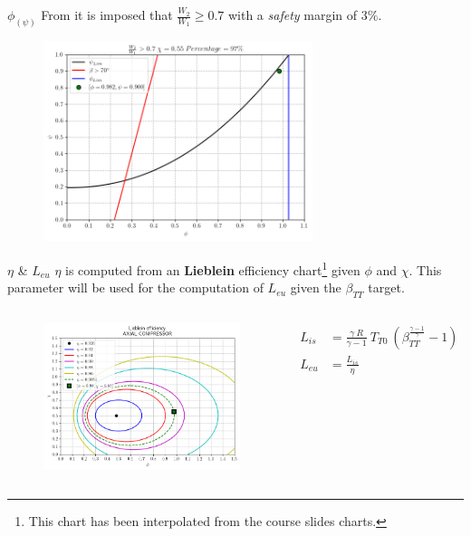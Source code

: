 	\begin{frame}{$\phi_{(\psi)}$}
		From \cite[Sec. 10.4]{axial2004} it is imposed that $\frac{W_2}{W_1} \geq 0.7$ with a \textit{safety} margin of $3 \%$.  
		\begin{figure}
			\centering
			\includegraphics[width=0.7\textwidth]{figures/stagePerf.png}
		\end{figure}
	\end{frame}
	\begin{frame}{$\eta$ \& $L_{eu}$}
		$\eta$ is computed from an \textbf{Lieblein} efficiency chart\footnote{This chart has been interpolated from the course slides charts.} given $\phi$ and $\chi$. This parameter will be used for the computation of $L_{eu}$ given the $\beta_{TT}$ target.
		\begin{columns}
				\begin{figure}
					\centering 
					\includegraphics[width=1\textwidth]{figures/efficiency.png}
				\end{figure}
			\begin{align}
				L_{is} & = \frac{\gamma \ R}{\gamma - 1} \ T_{T0} \ (\beta_{TT}^{{\frac{\gamma - 1}{\gamma}}} - 1) \nonumber \\
				L_{eu} & = \frac{L_{is}}{\eta} \nonumber
			\end{align}
		\end{columns}
	\end{frame}
